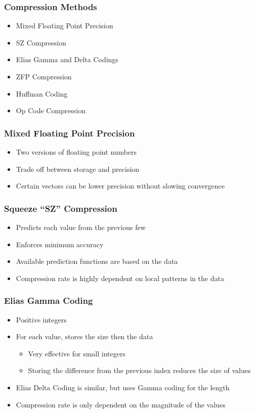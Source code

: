 \documentclass{beamer}
\begin{document}
\begin{frame}
	\frametitle{Compression Methods}
	\begin{itemize}
		\item<1-2> Mixed Floating Point Precision
		\item<1-2> SZ Compression
		\item<1-2> Elias Gamma and Delta Codings
		\item<1> ZFP Compression
		\item<1> Huffman Coding
		\item<1> Op Code Compression
	\end{itemize}
\end{frame}

\begin{frame}
	\frametitle{Mixed Floating Point Precision}
	\begin{itemize}
		\item Two versions of floating point numbers
		\item Trade off between storage and precision
		\item Certain vectors can be lower precision without slowing convergence
	\end{itemize}
\end{frame}

\begin{frame}
	\frametitle{Squeeze ``SZ'' Compression}
	\begin{itemize}
		\item Predicts each value from the previous few
		\item Enforces minimum accuracy
		\pause
		\item Available prediction functions are based on the data
		\pause
		\item Compression rate is highly dependent on local patterns in the data
	\end{itemize}
\end{frame}

\begin{frame}
	\frametitle{Elias Gamma Coding}
	\begin{itemize}
		\item Positive integers
		\item For each value, stores the size then the data
		\begin{itemize}
			\item Very effective for small integers
			\item Storing the difference from the previous index reduces the size of values
		\end{itemize}
		\pause
		\item Elias Delta Coding is similar, but uses Gamma coding for the length
		\pause
		\item Compression rate is only dependent on the magnitude of the values
	\end{itemize}
\end{frame}
\end{document}
